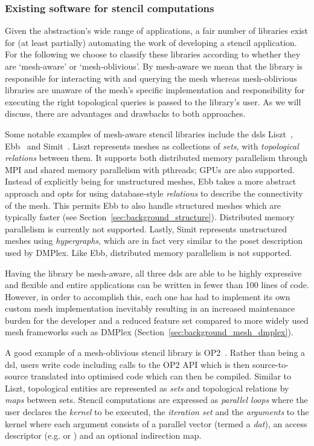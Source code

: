 \subsubsection{Existing software for stencil computations}
\label{sec:stencillang}

Given the abstraction's wide range of applications, a fair number of libraries exist for (at least partially) automating the work of developing a stencil application.
For the following we choose to classify these libraries according to whether they are `mesh-aware' or `mesh-oblivious'.
By mesh-aware we mean that the library is responsible for interacting with and querying the mesh whereas mesh-oblivious libraries are unaware of the mesh's specific implementation and responsibility for executing the right topological queries is passed to the library's user.
As we will discuss, there are advantages and drawbacks to both approaches.

Some notable examples of mesh-aware stencil libraries include the \glspl{dsl} Liszt~\cite{devitoLisztDomainSpecific2011}, Ebb~\cite{bernsteinEbbDSLPhysical2016} and Simit~\cite{kjolstadSimitLanguagePhysical2016}.
Liszt represents meshes as collections of \textit{sets}, with \textit{topological relations} between them.
It supports both distributed memory parallelism through MPI and shared memory parallelism with pthreads; GPUs are also supported.
Instead of explicitly being for unstructured meshes, Ebb takes a more abstract approach and opts for using database-style \textit{relations} to describe the connectivity of the mesh.
This permits Ebb to also handle structured meshes which are typically faster (see Section~\ref{sec:background_structure}).
Distributed memory parallelism is currently not supported.
Lastly, Simit represents unstructured meshes using \textit{hypergraphs}, which are in fact very similar to the \gls{poset} description used by DMPlex.
Like Ebb, distributed memory parallelism is not supported.

Having the library be mesh-aware, all three \glspl{dsl} are able to be highly expressive and flexible and entire applications can be written in fewer than 100 lines of code.
However, in order to accomplish this, each one has had to implement its own custom mesh implementation inevitably resulting in an increased maintenance burden for the developer and a reduced feature set compared to more widely used mesh frameworks such as DMPlex (Section~\ref{sec:background_mesh_dmplex}).

A good example of a mesh-oblivious stencil library is OP2~\cite{mudaligeOP2ActiveLibrary2012,mudaligeDesignInitialPerformance2013}.
Rather than being a \gls{dsl}, users write code including calls to the OP2 API which is then source-to-source translated into optimised code which can then be compiled.
Similar to Liszt, topological entities are represented as \textit{sets} and topological relations by \textit{maps} between sets.
Stencil computations are expressed as \textit{parallel loops} where the user declares the \textit{kernel} to be executed, the \textit{iteration set} and the \textit{arguments} to the kernel where each argument consists of a parallel vector (termed a \textit{dat}), an access descriptor (e.g.  or ) and an optional indirection map.

